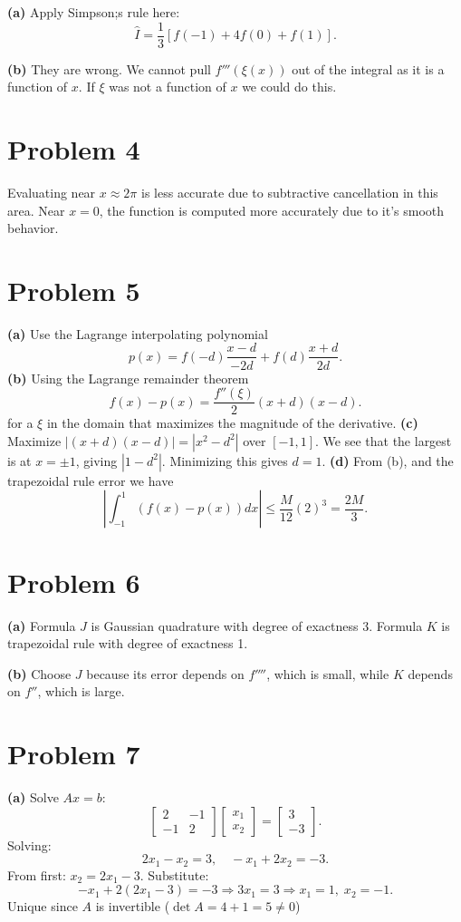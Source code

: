 \documentclass[11pt]{article}
\begin{document}
\textbf{(a)} 
Apply Simpson;s rule here:
$$ \hat{I} = \frac 1 3 \left[ f(-1) + 4f(0) + f(1) \right]. $$


\textbf{(b)} 
They are wrong. We cannot pull $f'''(\xi(x))$ out of the integral as it is a function of $x$. If $\xi$ was not a function of $x$ we could do this.

\section*{Problem 4}

Evaluating near $x\approx 2\pi$ is less accurate due to subtractive cancellation in this area. Near $x=0$, the function is computed more accurately due to it's smooth behavior.

\section*{Problem 5}

\textbf{(a)} 
Use the Lagrange interpolating polynomial
$$ p(x) = f(-d) \frac{x-d}{-2d} + f(d) \frac{x+d}{2d}.$$
\textbf{(b)} 
Using the Lagrange remainder theorem
$$f(x) - p(x) = \frac{f''(\xi)}{2} (x+d)(x-d).$$
for a $\xi$ in the domain that maximizes the magnitude of the derivative.
\textbf{(c)} 
Maximize $|(x+d)(x-d)| = |x^2 - d^2|$ over $[-1,1]$. We see that the largest is at $x=\pm 1$, giving $|1-d^2|$. Minimizing this gives $d=1$.
\textbf{(d)} 
From (b), and the trapezoidal rule error we have
\[
\left|\int_{-1}^1 (f(x)-p(x))dx\right| \le \frac{M}{12}(2)^3 = \frac{2M}{3}.
\]

\section*{Problem 6}

\textbf{(a)} 
Formula $J$ is Gaussian quadrature with degree of exactness 3.  
Formula $K$ is trapezoidal rule with degree of exactness 1.

\textbf{(b)} 
Choose $J$ because its error depends on $f''''$, which is small, while $K$ depends on $f''$, which is large.

\section*{Problem 7}

\textbf{(a)} 
Solve $Ax=b$:
\[
\begin{bmatrix}2 & -1 \\ -1 & 2\end{bmatrix}
\begin{bmatrix}x_1 \\ x_2\end{bmatrix}
=
\begin{bmatrix}3 \\ -3\end{bmatrix}.
\]
Solving:
\[
2x_1 - x_2 = 3,\quad -x_1 + 2x_2 = -3.
\]
From first: $x_2 = 2x_1 - 3$. Substitute:
\[
-x_1 + 2(2x_1 - 3) = -3 \Rightarrow 3x_1 = 3 \Rightarrow x_1=1, \; x_2=-1.
\]
Unique since $A$ is invertible ($\det A = 4 + 1 = 5 \ne 0$)
\end{document}
